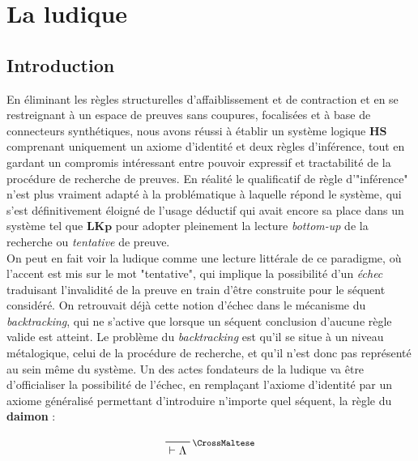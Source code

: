 \documentclass[11pt]{report}
\newcommand{\dai}{\text{\CrossMaltese}}
\newcommand{\seq}{\vdash}
\newcommand{\irule}[1]{\footnotesize$#1$}
\begin{document}
\chapter{La ludique}

\section{Introduction}

En éliminant les règles structurelles d'affaiblissement et de contraction et en se restreignant à un espace de preuves sans coupures, focalisées et à base de connecteurs synthétiques, nous avons réussi à établir un système logique $\mathbf{HS}$ comprenant uniquement un axiome d'identité et deux règles d'inférence, tout en gardant un compromis intéressant entre pouvoir expressif et tractabilité de la procédure de recherche de preuves. En réalité le qualificatif de règle d'"inférence" n'est plus vraiment adapté à la problématique à laquelle répond le système, qui s'est définitivement éloigné de l'usage déductif qui avait encore sa place dans un système tel que $\mathbf{LKp}$ pour adopter pleinement la lecture \textit{bottom-up} de la recherche ou \emph{tentative} de preuve.\\

On peut en fait voir la ludique comme une lecture littérale de ce paradigme, où l'accent est mis sur le mot "tentative", qui implique la possibilité d'un \emph{échec} traduisant l'invalidité de la preuve en train d'être construite pour le séquent considéré. On retrouvait déjà cette notion d'échec dans le mécanisme du \textit{backtracking}, qui ne s'active que lorsque un séquent conclusion d'aucune règle valide est atteint. Le problème du \textit{backtracking} est qu'il se situe à un niveau métalogique, celui de la procédure de recherche, et qu'il n'est donc pas représenté au sein même du système. Un des actes fondateurs de la ludique va être d'officialiser la possibilité de l'échec, en remplaçant l'axiome d'identité par un axiome généralisé permettant d'introduire n'importe quel séquent, la règle du \textbf{daimon} :

\begin{displaymath}
	\prftree[r]{\irule{\dai}}
		{\seq \Lambda}
\end{displaymath}
\end{document}
